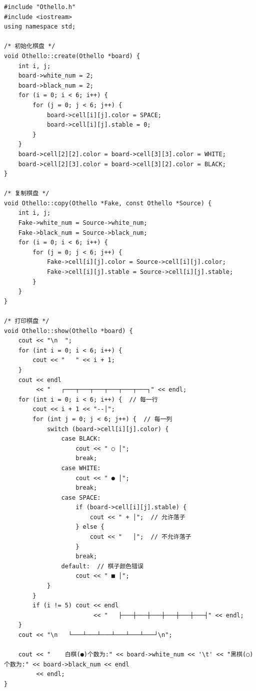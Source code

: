 \documentclass[a4paper, 11pt]{article}
\begin{document}
\begin{lstlisting}[title=Othello.cpp]
#include "Othello.h"
#include <iostream>
using namespace std;

/* 初始化棋盘 */
void Othello::create(Othello *board) {
    int i, j;
    board->white_num = 2;
    board->black_num = 2;
    for (i = 0; i < 6; i++) {
        for (j = 0; j < 6; j++) {
            board->cell[i][j].color = SPACE;
            board->cell[i][j].stable = 0;
        }
    }
    board->cell[2][2].color = board->cell[3][3].color = WHITE;
    board->cell[2][3].color = board->cell[3][2].color = BLACK;
}

/* 复制棋盘 */
void Othello::copy(Othello *Fake, const Othello *Source) {
    int i, j;
    Fake->white_num = Source->white_num;
    Fake->black_num = Source->black_num;
    for (i = 0; i < 6; i++) {
        for (j = 0; j < 6; j++) {
            Fake->cell[i][j].color = Source->cell[i][j].color;
            Fake->cell[i][j].stable = Source->cell[i][j].stable;
        }
    }
}

/* 打印棋盘 */
void Othello::show(Othello *board) {
    cout << "\n  ";
    for (int i = 0; i < 6; i++) {
        cout << "   " << i + 1;
    }
    cout << endl
         << "   ┌───┬───┬───┬───┬───┬───┐" << endl;
    for (int i = 0; i < 6; i++) {  // 每一行
        cout << i + 1 << "--│";
        for (int j = 0; j < 6; j++) {  // 每一列
            switch (board->cell[i][j].color) {
                case BLACK:
                    cout << " ○ │";
                    break;
                case WHITE:
                    cout << " ● │";
                    break;
                case SPACE:
                    if (board->cell[i][j].stable) {
                        cout << " + │";  // 允许落子
                    } else {
                        cout << "   │";  // 不允许落子
                    }
                    break;
                default:  // 棋子颜色错误
                    cout << " ■ │";
            }
        }
        if (i != 5) cout << endl
                         << "   ├───┼───┼───┼───┼───┼───┤" << endl;
    }
    cout << "\n   └───┴───┴───┴───┴───┴───┘\n";

    cout << "    白棋(●)个数为:" << board->white_num << '\t' << "黑棋(○)个数为:" << board->black_num << endl
         << endl;
}


\end{lstlisting}
\end{document}

